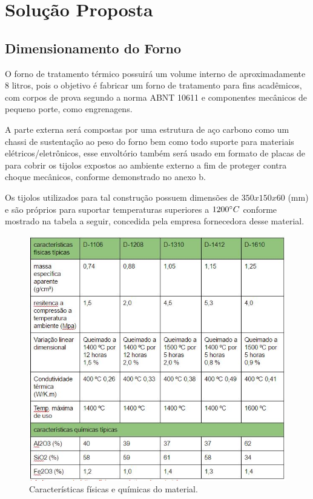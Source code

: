 \chapter[Solução Proposta]{Solução Proposta}


\section{Dimensionamento do Forno}

O forno de tratamento térmico possuirá um volume interno de aproximadamente 8 litros, pois o objetivo é fabricar um forno de tratamento para fins acadêmicos, com corpos de prova segundo a norma ABNT 10611 e componentes mecânicos de pequeno porte, como engrenagens.

A parte externa será compostas por uma estrutura de aço carbono como um chassi de sustentação ao peso do forno bem como todo suporte para materiais elétricos/eletrônicos, esse envoltório também será usado em formato de placas de para cobrir os tijolos expostos ao ambiente externo a fim de proteger contra choque mecânicos, conforme demonstrado no anexo b.

Os tijolos utilizados para tal construção possuem dimensões de $350 x 150 x 60$ (mm) e são próprios para suportar temperaturas superiores a $1200 \degree C$ conforme mostrado na tabela a seguir, concedida pela empresa fornecedora desse material.

\begin{figure}[h]
	\centering
	\label{tabela_dimensoes}
	\includegraphics[keepaspectratio=true,scale=1.0]{figuras/tabela_dimensoes.JPG}
	\caption{Características físicas e químicas do material.}
\end{figure}

